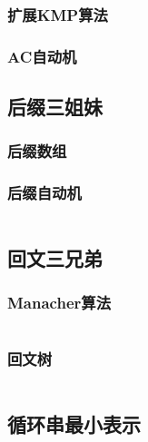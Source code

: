 \documentclass[a4paper]{article}
\newcommand{\cppcode}[1]{
    \inputminted[mathescape]{cpp}{source/#1}
}
\begin{document}
\cppcode{string-manipulation/knuth-morris-pratt.cpp}

\subsubsection{扩展KMP算法}

\subsubsection{AC自动机}


\subsection{后缀三姐妹}

\subsubsection{后缀数组}


\subsubsection{后缀自动机}

\cppcode{string-manipulation/suffix-automation.cpp}

\subsection{回文三兄弟}

\subsubsection{Manacher算法}

\cppcode{string-manipulation/manacher.cpp}

\subsubsection{回文树}

\cppcode{string-manipulation/palindrome-tree.cpp}

\subsection{循环串最小表示}

\cppcode{string-manipulation/minimum-circular-representation.cpp}
\end{document}
